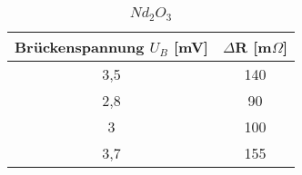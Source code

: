 \begin{table}[h]
	\begin{center}
		\begin{tabular}{cc}
			Brückenspannung $U_B$ [mV] & $\Delta$R [m$\Omega$]\\ \hline
			3,5	&140\\
			2,8	&90\\
			3	&100\\
			3,7	&155\\
		\end{tabular}
		\caption{$Nd_2O_3$}
		\label{tab2}
	\end{center}
\end{table}